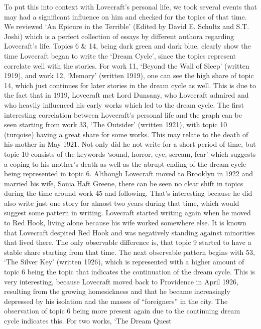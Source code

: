 To put this into context with Lovecraft’s personal life, we took several events that may had 
a significant influence on him and checked for the topics of that time. We reviewed ‘An 
Epicure in the Terrible’ (Edited by David E. Schultz and S.T. Joshi) which is a perfect 
collection of essays by different authora regarding Lovecraft’s life. Topics 6 \& 14, being 
dark green and dark blue, clearly show the time Lovecraft began to write the ‘Dream Cycle’, since 
the topics represent correlate well with the stories. For work 11, ‘Beyond the Wall of Sleep’ 
(written 1919), and work 12, ‘Memory’ (written 1919), one can see the high share of topic 14, 
which just continues for later stories in the dream cycle as well. This is due to the fact that 
in 1919, Lovecraft met Lord Dunsany, who Lovecraft admired and who heavily influenced his early 
works which led to the dream cycle. The first interesting correlation between Lovecraft’s 
personal life and the graph can be seen starting from work 33, ‘The Outsider’ (written 1921), 
with topic 10 (turqoise) having a great share for some works. This may relate to the death of 
his mother in May 1921. Not only did he not write for a short period of time, but topic 10 
consists of the keywords ‘sound, horror, eye, scream, fear’ which suggests a coping to his 
mother’s death as well as the abrupt ending of the dream cycle being represented in topic 6. 
Although Lovecraft moved to Brooklyn in 1922 and married his wife, Sonia Haft Greene, there 
can be seen no clear shift in topics during the time around work 45 and following. That’s 
interesting because he did also write just one story for almost two years during that time, 
which would suggest some pattern in writing. Lovecraft started writing again when he moved 
to Red Hook, living alone because his wife worked somewhere else. It is known that Lovecraft 
despited Red Hook and was negatively standing against minorities that lived there. The only 
observable difference is, that topic 9 started to have a stable share starting from that time. 
The next observable pattern begins with 53, ‘The Silver Key’ (written 1926), which is represented 
with a higher amount of topic 6 being the topic that indicates the continuation of the dream 
cycle. This is very interesting, because Lovecraft moved back to Providence in April 1926, 
resulting from the growing homesickness and that he became increasingly depressed by his 
isolation and the masses of “foreigners” in the city. The observation of topic 6 being more 
present again due to the continuing dream cycle indicates this. For two works, ‘The Dream Quest 
